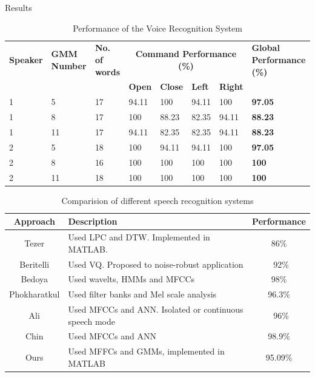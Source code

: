 \documentclass[final]{beamer}
\begin{document}
\begin{frame}{}
\begin{textblock}{39.5}
\begin{block}{Results}
\begin{table}[h]
\centering
\footnotesize
\begin{tabular}{||p{3.5cm}||p{4cm}||p{3cm}||p{4cm}||p{4cm}||p{4cm}||p{4cm}||p{6cm}||}%
\hline 
\textbf{Speaker} &  \textbf{GMM Number} & \textbf{No. of words} & \multicolumn{4}{|c||}{\textbf{Command Performance (\%)}} & \textbf{Global Performance (\%)}\\
\cline{4-7}
& & & \textbf{Open} & \textbf{Close} & \textbf{Left} & \textbf{Right} & \\
\hline \hline

1 &5 &17 &94.11 &100 &94.11 &100 & \textbf{97.05} \\
\hline 
1 &8 &17 &100 &88.23 &82.35 &94.11 &\textbf{88.23} \\
\hline
1 &11 &17 &94.11 &82.35 &82.35 &94.11 &\textbf{88.23} \\
\hline
2 &5 &18 &100 &94.11 &94.11 &100 & \textbf{97.05}\\
\hline
2 &8 &16 &100 &100 &100 &100 & \textbf{100}\\
\hline
2 &11 &18 &100 &100 &100 &100 & \textbf{100}\\
\hline

\end{tabular}
\caption{Performance of the Voice Recognition System}
\label{performance}
\end{table}

\begin{table}[!ht]
	\small
	\begin{center}	
	\begin{tabular}{|c | p{17.5cm} | c|}
	\hline
	\textbf{Approach} & \textbf{Description} & \textbf{Performance} \\
	\hline
	\hline
	Tezer \cite{Tezer} &
		Used LPC and DTW. Implemented in MATLAB. &
		86\% \\
	Beritelli \cite{Beritelli} &
		Used VQ. Proposed to noise-robust application &
		~92\% \\
	Bedoya \cite{Bedoya} &
		Used wavelts, HMMs and MFCCs &
		98\% \\
	Phokharatkul \cite{Phokharatkul} &
		Used filter banks and Mel scale analysis &
		96.3\% \\
	Ali \cite{Ali} &
		Used MFCCs and ANN. Isolated or continuous speech mode &
		~96\% \\
	Chin \cite{Chin} &
		Used MFCCs and ANN&
		98.9\% \\
	Ours &
		Used MFFCs and GMMs, implemented in MATLAB &
		95.09\%\\
	\hline
	\end{tabular}
	\end{center}	
	\caption{Comparision of different speech recognition systems}
	\label{table_comp}
\end{table}


\end{block}
\end{textblock}
\end{frame}
\end{document}
